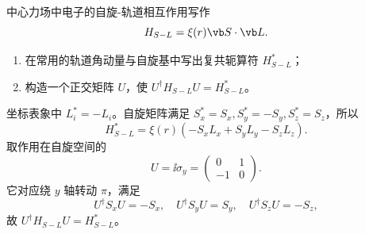 \begin{question}
中心力场中电子的自旋-轨道相互作用写作
\[
  H_{S-L}=\xi(r)\vb S\cdot\vb L.
\]
\begin{enumerate}
  \item 在常用的轨道角动量与自旋基中写出复共轭算符 $H_{S-L}^*$；
  \item 构造一个正交矩阵 $U$，使 $U^\dagger H_{S-L}U=H_{S-L}^*$。
\end{enumerate}
\begin{solution}
坐标表象中 $L_i^*=-L_i$。自旋矩阵满足 $S_x^*=S_x,S_y^*=-S_y,S_z^*=S_z$，所以
\[
  H_{S-L}^*=\xi(r)(-S_xL_x+S_yL_y-S_zL_z).
\]
取作用在自旋空间的
\[
  U=\ii\sigma_y=
  \begin{pmatrix}0&1\\-1&0\end{pmatrix}.
\]
它对应绕 $y$ 轴转动 $\pi$，满足
\[
  U^\dagger S_xU=-S_x,
  \quad U^\dagger S_yU=S_y,
  \quad U^\dagger S_zU=-S_z,
\]
故 $U^\dagger H_{S-L}U=H_{S-L}^*$。
\end{solution}
\end{question}
